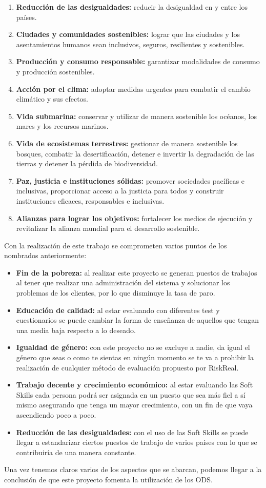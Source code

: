\begin{enumerate}
    \item \textbf{Reducción de las desigualdades:} reducir la desigualdad en y entre los países.
    \item \textbf{Ciudades y comunidades sostenibles:} lograr que las ciudades y los asentamientos humanos sean inclusivos, seguros, resilientes y sostenibles.
    \item \textbf{Producción y consumo responsable:} garantizar modalidades de consumo y producción sostenibles.
    \item \textbf{Acción por el clima:} adoptar medidas urgentes para combatir el cambio climático y sus efectos.
    \item \textbf{Vida submarina:} conservar y utilizar de manera sostenible los océanos, los mares y los recursos marinos.
    \item \textbf{Vida de ecosistemas terrestres:} gestionar de manera sostenible los bosques, combatir la desertificación, detener e invertir la degradación de las tierras y detener la pérdida de biodiversidad.
    \item \textbf{Paz, justicia e instituciones sólidas:} promover sociedades pacíficas e inclusivas, proporcionar acceso a la justicia para todos y construir instituciones eficaces, responsables e inclusivas.
    \item \textbf{Alianzas para lograr los objetivos:} fortalecer los medios de ejecución y revitalizar la alianza mundial para el desarrollo sostenible.
\end{enumerate}

Con la realización de este trabajo se comprometen varios puntos de los nombrados anteriormente:
\begin{itemize}
    \item \textbf{Fin de la pobreza:} al realizar este proyecto se generan puestos de trabajos al tener que realizar una administración del sistema y solucionar los problemas de los clientes, por lo que disminuye la tasa de paro.
    \item \textbf{Educación de calidad:} al estar evaluando con diferentes test y cuestionarios se puede cambiar la forma de enseñanza de aquellos que tengan una media baja respecto a lo deseado.
    \item \textbf{Igualdad de género:} con este proyecto no se excluye a nadie, da igual el género que seas o como te sientas en ningún momento se te va a prohibir la realización de cualquier método de evaluación propuesto por RiskReal.
    \item \textbf{Trabajo decente y crecimiento económico:} al estar evaluando las Soft Skills cada persona podrá ser asignada en un puesto que sea más fiel a sí mismo asegurando que tenga un mayor crecimiento, con un fin de que vaya ascendiendo poco a poco.
    \item \textbf{Reducción de las desigualdades:} con el uso de las Soft Skills se puede llegar a estandarizar ciertos puestos de trabajo de varios países con lo que se contribuiría de una manera constante.
\end{itemize}
Una vez tenemos claros varios de los aspectos que se abarcan, podemos llegar a la conclusión de que este proyecto fomenta la utilización de los ODS.